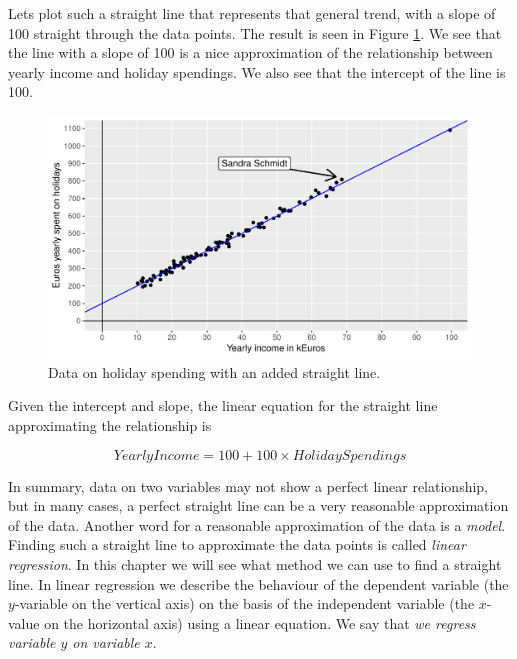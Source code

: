 \documentclass[]{report}\usepackage[]{graphicx}\usepackage[]{color}
\makeatletter
\def\maxwidth{ %
  \ifdim\Gin@nat@width>\linewidth
    \linewidth
  \else
    \Gin@nat@width
  \fi
}
\newenvironment{knitrout}{}{} %
\makeatother
\begin{document}
Lets plot such a straight line that represents that general trend, with a slope of 100 straight through the data points. The result is seen in Figure \ref{fig:lm_9}. We see that the line with a slope of 100 is a nice approximation of the relationship between yearly income and holiday spendings. We also see that the intercept of the line is 100.

\begin{knitrout}
\color{fgcolor}\begin{figure}

{\centering \includegraphics[width=\maxwidth]{figure/lm_9-1} 

}

\caption[Data on holiday spending with an added straight line]{Data on holiday spending with an added straight line.}\label{fig:lm_9}
\end{figure}


\end{knitrout}

Given the intercept and slope, the linear equation for the straight line approximating the relationship is

\begin{equation}
YearlyIncome = 100 + 100 \times HolidaySpendings
\end{equation}

In summary, data on two variables may not show a perfect linear relationship, but in many cases, a perfect straight line can be a very reasonable approximation of the data. Another word for a reasonable approximation of the data is a \textit{model}. Finding such a straight line to approximate the data points is called \textit{linear regression}. In this chapter we will see what method we can use to find a straight line. In linear regression we describe the behaviour of the dependent variable (the $y$-variable on the vertical axis) on the basis of the independent variable (the $x$-value on the horizontal axis) using a linear equation. We say that \textit{we regress variable $y$ on variable $x$}.
\end{document}
